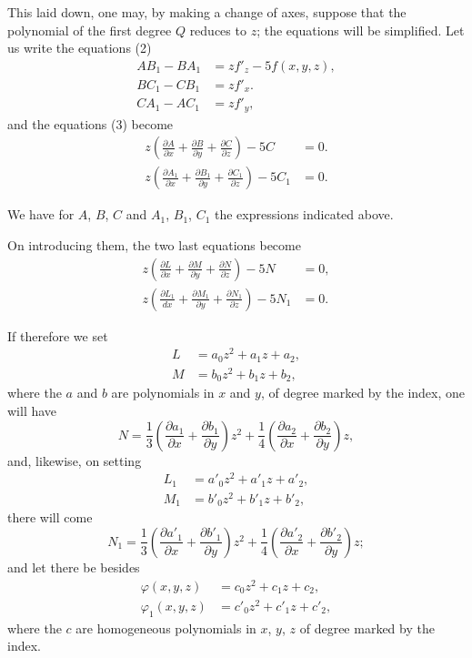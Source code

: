 \documentclass{article}
\begin{document}
This laid down, one may, by making a change of axes, suppose that the polynomial of the first degree $Q$ reduces to $z$; the equations will be simplified. Let us write the equations (2)
\[
\begin{aligned}
AB_{1} - BA_{1} &= zf'_{z} - 5f(x, y, z), \\
BC_{1} - CB_{1} &= zf'_{x}. \\
CA_{1} - AC_{1} &= zf'_{y},
\end{aligned}
\tag{4}
\]
and the equations (3) become
\[
\begin{aligned}
z\left(\frac{\partial A}{\partial x} + \frac{\partial B}{\partial y} + \frac{\partial C}{\partial z}\right) - 5C &= 0. \\
z\left(\frac{\partial A_{1}}{\partial x} + \frac{\partial B_{1}}{\partial y} + \frac{\partial C_{1}}{\partial z}\right) - 5C_{1} &= 0.
\end{aligned}
\]

We have for $A$, $B$, $C$ and $A_{1}$, $B_{1}$, $C_{1}$ the expressions indicated above.


On introducing them, the two last equations become
\[
\begin{aligned}
z\left(\frac{\partial L}{\partial x} + \frac{\partial M}{\partial y} + \frac{\partial N}{\partial z}\right) - 5N &= 0, \\
z\left(\frac{\partial L_{1}}{dx} + \frac{\partial M_{1}}{\partial y} + \frac{\partial N_{1}}{\partial z}\right) - 5N_{1} &= 0.
\end{aligned}
\]

If therefore we set
\[
\begin{aligned}
L &= a_{0}z^{2} + a_{1}z + a_{2}, \\
M &= b_{0}z^{2} + b_{1}z + b_{2},
\end{aligned}
\]
where the $a$ and $b$ are polynomials in $x$ and $y$, of degree marked by the index, one will have
\[
N = \frac{1}{3}\left(\frac{\partial a_{1}}{\partial x} + \frac{\partial b_{1}}{\partial y}\right)z^{2} + \frac{1}{4}\left(\frac{\partial a_{2}}{\partial x} + \frac{\partial b_{2}}{\partial y}\right)z,
\]
and, likewise, on setting
\[
\begin{aligned}
L_{1} &= a'_{0}z^{2} + a'_{1}z + a'_{2}, \\
M_{1} &= b'_{0}z^{2} + b'_{1}z + b'_{2},
\end{aligned}
\]
there will come
\[
N_{1} = \frac{1}{3}\left(\frac{\partial a'_{1}}{\partial x} + \frac{\partial b'_{1}}{\partial y}\right)z^{2} + \frac{1}{4}\left(\frac{\partial a'_{2}}{\partial x} + \frac{\partial b'_{2}}{\partial y}\right)z;
\]
and let there be besides
\[
\begin{aligned}
\varphi(x, y, z) &= c_{0}z^{2} + c_{1}z + c_{2}, \\
\varphi_{1}(x, y, z) &= c'_{0}z^{2} + c'_{1}z + c'_{2},
\end{aligned}
\]
where the $c$ are homogeneous polynomials in $x$, $y$, $z$ of degree marked by the index.
\end{document}
